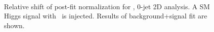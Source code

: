 \begin{figure}[!hbtp]
{}
\\
\caption{Relative shift of post-fit normalization for  \GeV, 0-jet 2D analysis.
A SM Higgs signal with  \GeV\ is injected. Results of background+signal fit are shown.}
\label{fig:norm_inj125_0j_125_sfit}
\end{figure}

